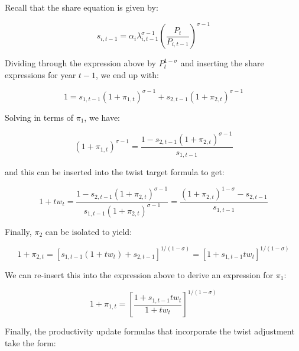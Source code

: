 \noindent Recall that the share equation is given by:

\begin{displaymath}
{{s}_{i,t-1}}={{\alpha }_{i}}\lambda _{i,t-1}^{\sigma -1}{{\left(
\frac{{{P}_{t}}}{{{P}_{i,t-1}}} \right)}^{\sigma -1}}
\end{displaymath}

\noindent Dividing through the expression above by $P_t^{1-\sigma}$ and inserting the share
expressions for year $t-1$, we end up with:

\begin{displaymath}
1={{s}_{1,t-1}}{{(1+{{\pi }_{1,t}})}^{\sigma -1}}+{{s}_{2,t-1}}{{(1+{{\pi
}_{2,t}})}^{\sigma -1}}
\end{displaymath}

\noindent Solving in terms of $\pi_1$, we have:

\begin{displaymath}
{{(1+{{\pi }_{1,t}})}^{\sigma -1}}=\frac{1-{{s}_{2,t-1}}{{(1+{{\pi }_{2,t}})}^{\sigma -
1}}}{{{s}_{1,t-1}}}
\end{displaymath}

\noindent and this can be inserted into the twist target formula to get:

\begin{displaymath}
1+t{{w}_{t}}=\frac{1-{{s}_{2,t-1}}{{(1+{{\pi }_{2,t}})}^{\sigma -1}}}{{{s}_{1,t-
1}}{{\left( 1+{{\pi }_{2,t}} \right)}^{\sigma -1}}}=\frac{{{\left( 1+{{\pi }_{2,t}}
\right)}^{1-\sigma }}-{{s}_{2,t-1}}}{{{s}_{1,t-1}}}
\end{displaymath}

\noindent Finally, $\pi_2$ can be isolated to yield:

\begin{displaymath}
1+{{\pi }_{2,t}}={{\left[ {{s}_{1,t-1}}(1+t{{w}_{t}})+{{s}_{2,t-1}} \right]}^{1/(1-
\sigma )}}={{\left[ 1+{{s}_{1,t-1}}t{{w}_{t}} \right]}^{1/(1-\sigma )}}
\end{displaymath}

\noindent We can re-insert this into the expression above to derive an expression for $\pi_1$:

\begin{displaymath}
1+{{\pi }_{1,t}}={{\left[ \frac{1+{{s}_{1,t-1}}t{{w}_{t}}}{1+t{{w}_{t}}}
\right]}^{1/(1-\sigma )}}
\end{displaymath}

\noindent Finally, the productivity update formulas that incorporate the twist adjustment take the form:

